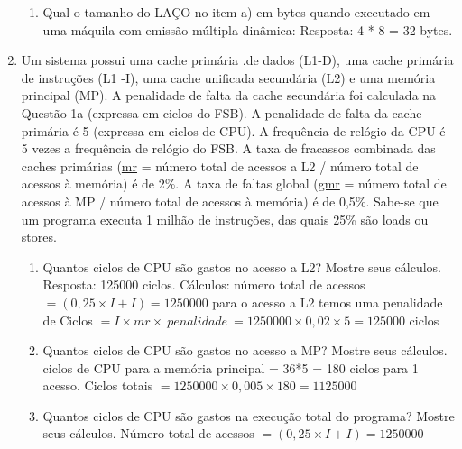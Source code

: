 \documentclass{article}
\begin{document}
\begin{enumerate}
\begin{enumerate}
\item Qual o tamanho do LAÇO no item a) em bytes quando executado em uma máquila
com emissão múltipla dinâmica: Resposta: 4 * 8 = 32 bytes.
\end{enumerate}

\item Um sistema possui uma cache primária .de dados (L1-D), uma cache primária
de instruções (L1 -I), uma cache unificada secundária (L2) e uma memória
principal (MP). A penalidade de falta da cache secundária foi calculada na
Questão 1a (expressa em ciclos do FSB). A penalidade de falta da cache primária
é 5 (expressa em ciclos de CPU). A frequência de relógio da CPU é 5 vezes a
frequência de relógio do FSB. A taxa de fracassos combinada das caches primárias
(\underline{mr} = número total de acessos a L2 / número total de acessos à
memória) é de 2\%. A taxa de faltas global (\underline{gmr} = número total de
acessos à MP / número total de acessos à memória) é de 0,5\%. Sabe-se que um
programa executa 1 milhão de instruções, das quais 25\% são loads ou stores.

\begin{enumerate}
\item Quantos ciclos de CPU são gastos no acesso a L2? Mostre seus cálculos.
Resposta: 125000 ciclos. Cálculos: número total de acessos $= (0,25 \times I +
I) = 1250000$ para o acesso a L2 temos uma penalidade de Ciclos $= I \times mr
\times\ penalidade\ = 1250000 \times 0,02 \times 5 = 125000$ ciclos

\item Quantos ciclos de CPU são gastos no acesso a MP? Mostre seus cálculos.
ciclos de CPU para a memória principal = 36*5 = 180 ciclos para 1 acesso. Ciclos
totais $= 1250000 \times 0,005 \times 180 = 1125000$

\item Quantos ciclos de CPU são gastos na execução total do programa? Mostre
seus cálculos. Número total de acessos $= (0,25 \times I + I) = 1250000$
\end{enumerate}
\end{enumerate}
\end{document}
